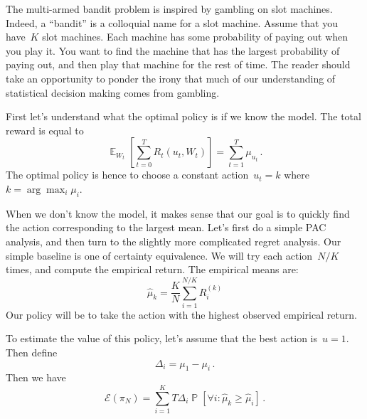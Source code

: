 \documentclass{tufte-book}
\begin{document}
The multi-armed bandit problem is inspired by gambling on slot machines.
Indeed, a ``bandit'' is a colloquial name for a slot machine. Assume
that you have~\(K\) slot machines. Each machine has some probability of
paying out when you play it. You want to find the machine that has the
largest probability of paying out, and then play that machine for the
rest of time. The reader should take an opportunity to ponder the irony
that much of our understanding of statistical decision making comes from
gambling.

First let's understand what the optimal policy is if we know the model.
The total reward is equal to \[
    \mathop\mathbb{E}_{W_t}\left[ \sum_{t=0}^T R_t(u_t,W_t) \right] = \sum_{t=1}^T \mu_{u_t}\,.
\] The optimal policy is hence to choose a constant action~\(u_{t}=k\)
where~\(k = \arg\max_i \mu_i\).

When we don't know the model, it makes sense that our goal is to quickly
find the action corresponding to the largest mean. Let's first do a
simple PAC analysis, and then turn to the slightly more complicated
regret analysis. Our simple baseline is one of certainty equivalence. We
will try each action~\(N/K\) times, and compute the empirical return.
The empirical means are: \[
    \hat{\mu}_k = \frac{K}{N} \sum_{i=1}^{N/K} R_i^{(k)}
\] Our policy will be to take the action with the highest observed
empirical return.

To estimate the value of this policy, let's assume that the best action
is~\(u=1\). Then define \[
    \Delta_i  = \mu_1 -\mu_i\,.
\] Then we have \[
    \mathcal{E}(\pi_N) = \sum_{i=1}^K T \Delta_i \mathop\mathbb{P}[\forall i\colon \hat{\mu}_k \geq \hat{\mu}_i]\,.
\]
\end{document}

